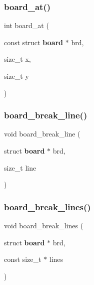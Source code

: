 \subsubsection{board\+\_\+at()}
{\footnotesize\ttfamily int board\+\_\+at (\begin{DoxyParamCaption}\item[{const struct \textbf{ board} $\ast$}]{brd,  }\item[{size\+\_\+t}]{x,  }\item[{size\+\_\+t}]{y }\end{DoxyParamCaption})\hspace{0.3cm}{\ttfamily [inline]}}

\mbox{\label{board_8h_a273970b38366ac7968ad05805c9674ad}} 
\subsubsection{board\+\_\+break\+\_\+line()}
{\footnotesize\ttfamily void board\+\_\+break\+\_\+line (\begin{DoxyParamCaption}\item[{struct \textbf{ board} $\ast$}]{brd,  }\item[{size\+\_\+t}]{line }\end{DoxyParamCaption})\hspace{0.3cm}{\ttfamily [inline]}}

\mbox{\label{board_8h_afa8d5a563ecd52ae02e10cbb645c3782}} 
\subsubsection{board\+\_\+break\+\_\+lines()}
{\footnotesize\ttfamily void board\+\_\+break\+\_\+lines (\begin{DoxyParamCaption}\item[{struct \textbf{ board} $\ast$}]{brd,  }\item[{const size\+\_\+t $\ast$}]{lines }\end{DoxyParamCaption})\hspace{0.3cm}{\ttfamily [inline]}}

\mbox{\label{board_8h_af76d449d544ab57f7adaa2bf4d89b060}} 
